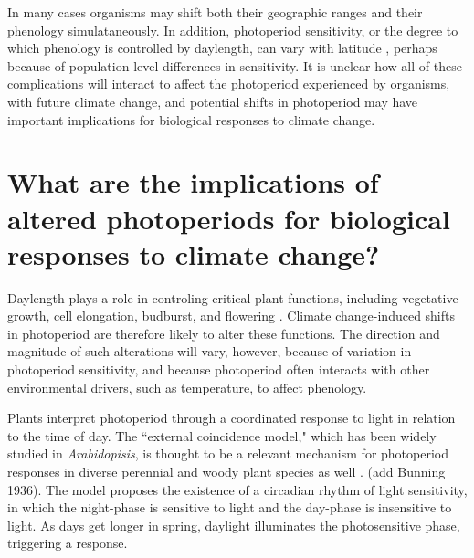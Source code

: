 \documentclass{article}
\begin{document}
\par In many cases organisms may shift both their geographic ranges and their phenology simulataneously. In addition, photoperiod sensitivity, or the degree to which phenology is controlled by daylength, can vary with latitude \citep{Howe:1996,saikkonen2012,Partanen:2005aa,Vihera-Aarnio:2006aa,Caffarra:2011b,gauzere2017}, perhaps because of population-level differences in sensitivity. It is unclear how all of these complications will interact to affect the photoperiod experienced by organisms, with future climate change, and potential shifts in photoperiod may have important implications for biological responses to climate change.

\section*{What are the implications of altered photoperiods for biological responses to climate change?}
\par Daylength plays a role in controling critical plant functions, including vegetative growth, cell elongation, budburst, and flowering \citep{Linkosalo:2006aa,erwin1998,sidaway2010, Hsu:2011,Heide:2011aa,Ashby:1962aa,Heide:2012aa,mimura2007}. Climate change-induced shifts in photoperiod are therefore likely to alter these functions. The direction and magnitude of such alterations will vary, however, because of variation in photoperiod sensitivity, and because photoperiod often interacts with other environmental drivers, such as temperature, to affect phenology. 

\par Plants interpret photoperiod through a coordinated response to light in relation to the time of day.
The ``external coincidence model," which has been widely studied in \emph{Arabidopisis}, is thought to be a relevant mechanism for photoperiod responses in diverse perennial and woody plant species as well \citep{davis2002,petterle2013,bastow2002,kobayashi2007,andres2012,Singh:2017}. (add Bunning 1936). The model proposes the existence of a circadian rhythm of light sensitivity, in which the night-phase is sensitive to light and the day-phase is insensitive to light. As days get longer in spring, daylight illuminates the photosensitive phase, triggering a response.%
\end{document}
